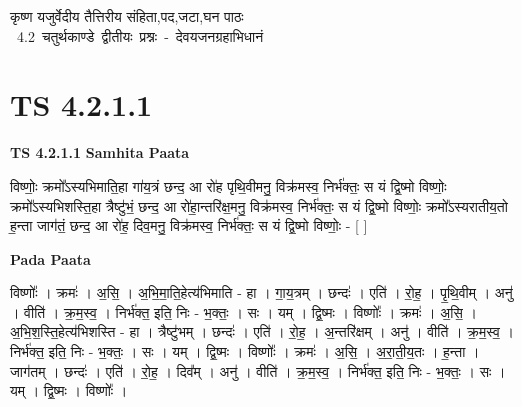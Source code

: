 \documentclass[17pt]{extarticle}
\begin{document}
\begin{titlepage}
    \begin{center}
 
\begin{sanskrit}
    { \Huge
    कृष्ण यजुर्वेदीय तैत्तिरीय संहिता,पद,जटा,घन पाठः 
    }
    \\
    \vspace{2.5cm}
    \mbox{ \Huge
    4.2      चतुर्थकाण्डे द्वीतीयः प्रश्नः - देवयजनग्रहाभिधानं   }
\end{sanskrit}
\end{center}

\end{titlepage}
\tableofcontents
\pagebreak

\section*{ TS 4.2.1.1 }

\textbf{TS 4.2.1.1 } \newline
\textbf{Samhita Paata} \newline

विष्णोः॒ क्रमो᳚ऽस्यभिमाति॒हा गा॑य॒त्रं छन्द॒ आ रो॑ह पृथि॒वीमनु॒ विक्र॑मस्व॒ निर्भ॑क्तः॒ स यं द्वि॒ष्मो विष्णोः॒ क्रमो᳚ऽस्यभिशस्ति॒हा त्रैष्टु॑भं॒ छन्द॒ आ रो॑हा॒न्तरि॑क्ष॒मनु॒ विक्र॑मस्व॒ निर्भ॑क्तः॒ स यं द्वि॒ष्मो विष्णोः॒ क्रमो᳚ऽस्यरातीय॒तो ह॒न्ता जाग॑तं॒ छन्द॒ आ रो॑ह॒ दिव॒मनु॒ विक्र॑मस्व॒ निर्भ॑क्तः॒ स यं द्वि॒ष्मो विष्णोः॒ - [  ] \newline

\textbf{Pada Paata} \newline

विष्णोः᳚ । क्रमः॑ । अ॒सि॒ । अ॒भि॒मा॒ति॒हेत्य॑भिमाति - हा । गा॒य॒त्रम् । छन्दः॑ । एति॑ । रो॒ह॒ । पृ॒थि॒वीम् । अनु॑ । वीति॑ । क्र॒म॒स्व॒ । निर्भ॑क्त॒ इति॒ निः - भ॒क्तः॒ । सः । यम् । द्वि॒ष्मः । विष्णोः᳚ । क्रमः॑ । अ॒सि॒ । अ॒भि॒श॒स्ति॒हेत्य॑भिशस्ति - हा । त्रैष्टु॑भम् । छन्दः॑ । एति॑ । रो॒ह॒ । अ॒न्तरि॑क्षम् । अनु॑ । वीति॑ । क्र॒म॒स्व॒ । निर्भ॑क्त॒ इति॒ निः - भ॒क्तः॒ । सः । यम् । द्वि॒ष्मः । विष्णोः᳚ । क्रमः॑ । अ॒सि॒ । अ॒रा॒ती॒य॒तः । ह॒न्ता । जाग॑तम् । छन्दः॑ । एति॑ । रो॒ह॒ । दिव᳚म् । अनु॑ । वीति॑ । क्र॒म॒स्व॒ । निर्भ॑क्त॒ इति॒ निः - भ॒क्तः॒ । सः । यम् । द्वि॒ष्मः । विष्णोः᳚ ।  \newline




\end{document}
